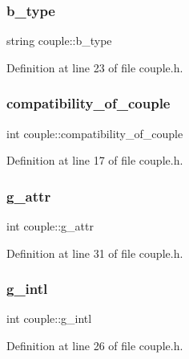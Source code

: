 \subsubsection{\texorpdfstring{b\+\_\+type}{b\_type}}
{\footnotesize\ttfamily string couple\+::b\+\_\+type}



Definition at line 23 of file couple.\+h.

\mbox{\label{classcouple_a24e7fa900a50df33f3acd1a834a0a3bc}} 
\subsubsection{\texorpdfstring{compatibility\+\_\+of\+\_\+couple}{compatibility\_of\_couple}}
{\footnotesize\ttfamily int couple\+::compatibility\+\_\+of\+\_\+couple}



Definition at line 17 of file couple.\+h.

\mbox{\label{classcouple_a75407f4baf081f692829f4277106eaca}} 
\subsubsection{\texorpdfstring{g\+\_\+attr}{g\_attr}}
{\footnotesize\ttfamily int couple\+::g\+\_\+attr}



Definition at line 31 of file couple.\+h.

\mbox{\label{classcouple_a838bdf34fd51d042238ce76588536ed2}} 
\subsubsection{\texorpdfstring{g\+\_\+intl}{g\_intl}}
{\footnotesize\ttfamily int couple\+::g\+\_\+intl}



Definition at line 26 of file couple.\+h.

\mbox{\label{classcouple_a83504092da15c4e3944a98de5898831c}} 

